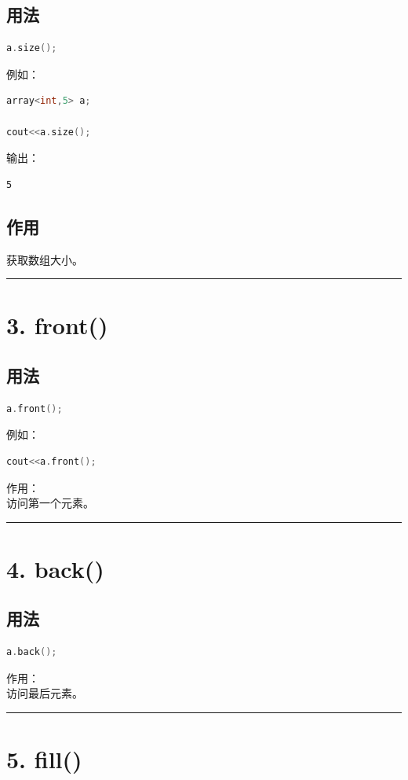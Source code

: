 \documentclass[10pt,twocolumn]{extarticle}
\begin{document}
\subsection{用法}
\begin{lstlisting}[language=C++]
a.size();
\end{lstlisting}
例如：
\begin{lstlisting}[language=C++]
array<int,5> a;

cout<<a.size();
\end{lstlisting}
输出：
\begin{lstlisting}
5
\end{lstlisting}

\subsection{作用}
获取数组大小。

\noindent\rule{\linewidth}{0.4pt}

\section{3. front()}

\subsection{用法}
\begin{lstlisting}[language=C++]
a.front();
\end{lstlisting}
例如：
\begin{lstlisting}[language=C++]
cout<<a.front();
\end{lstlisting}
作用：\\
访问第一个元素。

\noindent\rule{\linewidth}{0.4pt}

\section{4. back()}

\subsection{用法}
\begin{lstlisting}[language=C++]
a.back();
\end{lstlisting}
作用：\\
访问最后元素。

\noindent\rule{\linewidth}{0.4pt}

\section{5. fill()}
\end{document}
